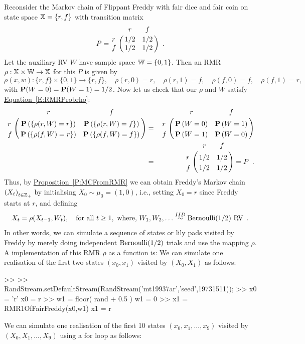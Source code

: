 \begin{example}\label{EX:RMRFreddy}
Reconsider the Markov chain of Flippant Freddy with fair dice and fair coin on state space $\mathbb{X}=\{r,f\}$ with transition matrix 
$$P=\bordermatrix{~ & r & f \cr
r & 1/2 & 1/2\cr
f & 1/2 &1/2}\enspace .$$
Let the auxiliary RV $W$ have sample space $\mathbb{W}=\{0,1\}$.  Then an RMR $\rho: \mathbb{X} \times \mathbb{W} \to \mathbb{X}$ for this $P$ is given by 
\[
\rho (x,w) : \{r,f\} \times \{0,1\} \to \{r,f\},
\quad \rho(r,0)=r, \quad \rho(r,1)=f, \quad \rho(f,0)=f,  \quad \rho(f,1)=r ,
\]
with $\mathbf{P}(W=0)=\mathbf{P}(W=1)=1/2$.  Now let us check that our $\rho$ and $W$ satisfy \hyperref[E:RMRProbrho]{Equation~\ref*{E:RMRProbrho}}:
\begin{eqnarray*}
\bordermatrix{~ & r & f \cr
r & \p \left( \{ \rho (r,W) = r \} \right) & \p \left( \{ \rho (r,W) = f \} \right) \cr
f & \p \left( \{ \rho (f,W) = r \} \right) & \p \left( \{ \rho (f,W) = f \} \right) }
&=&
\bordermatrix{~ & r & f \cr
r & \p \left( W=0 \right) & \p \left( W=1 \right) \cr
f & \p \left( W=1 \right) & \p \left( W=0 \right)} \\
&=&
\bordermatrix{~ & r & f \cr
r & 1/2 & 1/2\cr
f & 1/2 &1/2}
=
P \enspace .
\end{eqnarray*}
Thus, by \hyperref[P:MCFromRMR]{Proposition~\ref*{P:MCFromRMR}} we can obtain Freddy's Markov chain $\left(X_t\right)_{t\in \mathbb{Z}_+}$ by initialising $X_0 \sim \mu_0=(1,0)$, i.e., setting $X_0=r$ since Freddy starts at $r$, and defining
\[
X_t = \rho(X_{t-1},W_t), \quad \text{for all } t \geq 1, \text{ where, } W_1,W_2,\ldots \overset{IID}{\sim} \mbox{{\rm Bernoulli}}(1/2) \text{ RV} \enspace .
\]
In other words, we can simulate a sequence of states or lily pads visited by Freddy by merely doing independent $\mbox{{\rm Bernoulli}}(1/2)$ trials and use the mapping $\rho$.  A \Matlab implementation of this RMR $\rho$ as a \Matlab function is:
We can simulate one realisation of the first two states $(x_0,x_1)$ visited by $(X_0,X_1)$ as follows:
\begin{VrbM}
>> %
>> RandStream.setDefaultStream(RandStream('mt19937ar','seed',19731511));
>> x0 = 'r' %
x0 = r
>> w1 = floor( rand + 0.5 ) %
w1 =     0
>> x1 = RMR1OfFairFreddy(x0,w1) %
x1 = r
\end{VrbM}
We can simulate one realisation of the first 10 states $(x_0,x_1,\ldots,x_9)$ visited by $(X_0,X_1,\ldots, X_9)$ using a for loop as follows:

\end{example}
